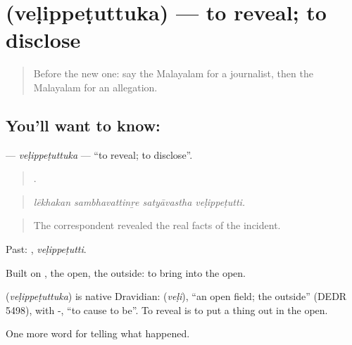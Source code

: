 \section[\texorpdfstring{\ml{വെളിപ്പെടുത്തുക} (veḷippeṭuttuka)}{വെളിപ്പെടുത്തുക (veḷippeṭuttuka)}]{ (veḷippeṭuttuka) — to reveal; to disclose}

\label{lesson:ML-C355-velippetuttuka}



\begin{quote}
Before the new one: say the Malayalam for a journalist, then the Malayalam for an allegation.
\end{quote}

\subsection*{You'll want to know: }
\textbf{} — \emph{veḷippeṭuttuka} — \textquotedblleft{}to reveal; to disclose\textquotedblright{}.

\begin{quote}
   .
\end{quote}

\begin{quote}
\emph{lēkhakan sambhavattinṟe satyāvastha veḷippeṭutti.}
\end{quote}

\begin{quote}
The correspondent revealed the real facts of the incident.
\end{quote}

Past: , \emph{veḷippeṭutti}.

Built on , the open, the outside: to bring into the open.

\begin{cousinweb}
\textbf{} (\emph{veḷippeṭuttuka}) is native Dravidian:  (\emph{veḷi}), \textquotedblleft{}an open field; the outside\textquotedblright{} (DEDR 5498), with -, \textquotedblleft{}to cause to be\textquotedblright{}. To reveal is to put a thing out in the open.
\end{cousinweb}

\begin{grammarlens}[title={What you've built}]
One more word for telling what happened.
\end{grammarlens}


